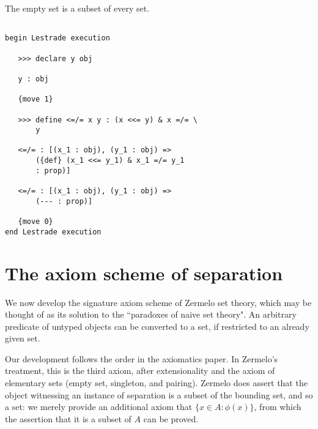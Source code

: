 \documentclass[12pt]{article}
\begin{document}
The empty set is a subset of every set.

\begin{verbatim}

begin Lestrade execution

   >>> declare y obj

   y : obj

   {move 1}

   >>> define <=/= x y : (x <<= y) & x =/= \
       y

   <=/= : [(x_1 : obj), (y_1 : obj) => 
       ({def} (x_1 <<= y_1) & x_1 =/= y_1 
       : prop)]

   <=/= : [(x_1 : obj), (y_1 : obj) => 
       (--- : prop)]

   {move 0}
end Lestrade execution
\end{verbatim}

\section{The axiom scheme of separation}

We now develop the signature axiom scheme of Zermelo set theory, which may be thought of as its solution to the ``paradoxes of naive set theory".  An arbitrary predicate of untyped objects can be converted to a set, if restricted to an already given set.

Our development follows the order in the axiomatics paper.  In Zermelo's treatment, this is the third axiom, after extensionality and the axiom of elementary sets
(empty set, singleton, and pairing).  Zermelo does assert that the object witnessing an instance of separation is a subset of the bounding set, and so a set:  we merely provide
an additional axiom that $\{x \in A : \phi(x)\}$, from which the assertion that it is a subset of $A$ can be proved.
\end{document}
